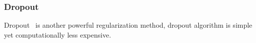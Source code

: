 \subsubsection{Dropout}

Dropout~\cite{JMLR:v15:srivastava14a} is another powerful regularization method, dropout algorithm is simple yet  computationally less expensive. 